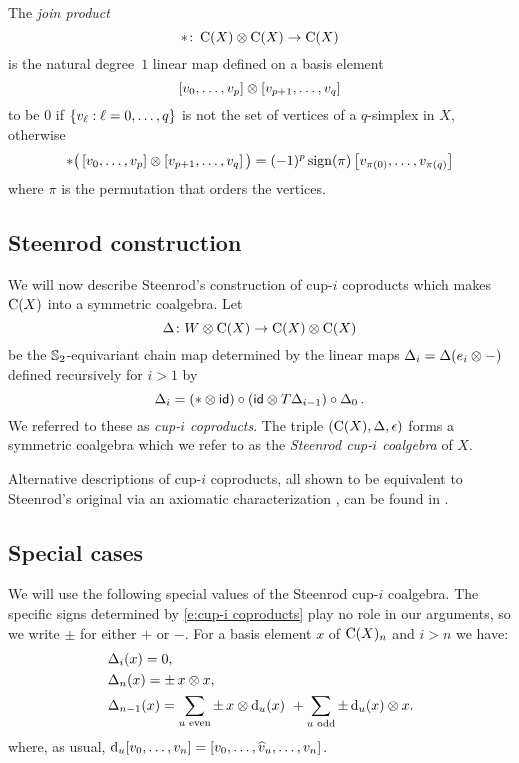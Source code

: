 The \textit{join product}
\[
\ast \colon \operatorname{C}(X) \otimes \operatorname{C}(X) \to \operatorname{C}(X)
\]
is the natural degree~$1$ linear map defined on a basis element
\[
[v_0, \dots, v_p] \otimes [v_{p+1}, \dots, v_q]
\]
to be $0$ if $\{v_\ell : \ell = 0, \dots, q\}$ is not the set of vertices of a $q$-simplex in $X$, otherwise
\[
\ast \big(\left[v_0, \dots, v_p \right] \otimes \left[v_{p+1}, \dots, v_q\right]\big) =
(-1)^{p} \operatorname{sign}(\pi) \left[v_{\pi(0)}, \dots, v_{\pi(q)}\right]
\]
where $\pi$ is the permutation that orders the vertices.

\subsection{Steenrod construction}\label{ss:cup-i}

We will now describe Steenrod's construction of cup-$i$ coproducts \cite[p.293]{steenrod1947products} which makes $\operatorname{C}(X)$ into a symmetric coalgebra.
Let
\[
\operatorname{\Delta} \colon W \otimes \operatorname{C}(X) \to \operatorname{C}(X) \otimes \operatorname{C}(X)
\]
be the $\mathbb{S}_2$-equivariant chain map determined by the linear maps $\operatorname{\Delta}_i = \operatorname{\Delta}(e_i \otimes -)$ defined recursively for $i > 1$ by
\begin{equation}\label{e:cup-i coproducts}
	\operatorname{\Delta}_i =
	(\ast \otimes \mathsf{id}) \circ (\mathsf{id} \otimes T\!\operatorname{\Delta}_{i-1}) \circ \operatorname{\Delta}_0.
\end{equation}
We referred to these as \textit{cup-$i$ coproducts}.
The triple $(\operatorname{C}(X), \operatorname{\Delta}, \operatorname{\epsilon})$ forms a symmetric coalgebra which we refer to as the \textit{Steenrod cup-$i$ coalgebra} of $X$.

Alternative descriptions of cup-$i$ coproducts, all shown to be equivalent to Steenrod's original via an axiomatic characterization \cite{medina2022axiomatic}, can be found in \cite{real1996computability, gonzalez-diaz1999steenrod, mcclure2003multivariable, medina2023fast_sq}.

\subsection{Special cases}\label{ss:special_cases}

We will use the following special values of the Steenrod cup-$i$ coalgebra.
The specific signs determined by \eqref{e:cup-i coproducts} play no role in our arguments, so we write $\pm$ for either $+$ or $-$.
For a basis element $x$ of $\operatorname{C}(X)_n$ and $i > n$ we have:
\begin{align}
	&\operatorname{\Delta}_i(x) = 0, \\
	&\operatorname{\Delta}_n(x) = \pm \, x \otimes x, \\
	&\operatorname{\Delta}_{n-1}(x) =
	\sum_{u \text{ even}} \pm \, x \otimes \operatorname{d}_u(x) \ +
	\sum_{u \text{ odd}} \pm \operatorname{d}_u(x) \otimes x.
\end{align}
where, as usual, $\operatorname{d}_u [v_0,\dots,v_n] = [v_0,\dots,\widehat{v}_u,\dots,v_n]$.

